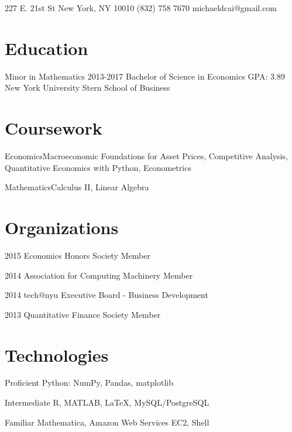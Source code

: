 \documentclass{tccv}
\begin{document}
\personal
    {227 E. 21st St \newline New York, NY 10010}
    {(832) 758 7670}
    {michaeldcai@gmail.com}

\section{Education}

\begin{yearlist}

\item[Minor in Mathematics]{2013-2017}
     {Bachelor of Science \newline in Economics \newline GPA: 3.89}
     {New York University \newline Stern School of Business}

\end{yearlist}

\section{Coursework}

\begin{factlist}
\item{Economics}{Macroeconomic Foundations for Asset Prices, Competitive Analysis,
Quantitative Economics with Python, Econometrics}
\item{Mathematics}{Calculus II, Linear Algebra}
\end{factlist}

\section{Organizations}

\begin{yearlist}

\item{2015}
     {Economics Honors Society}
     {Member}

\item{2014}
     {Association for Computing \newline Machinery}
     {Member}

\item{2014}
     {tech@nyu}
     {Executive Board - Business Development}

\item{2013}
     {Quantitative Finance Society}
     {Member}

\end{yearlist}


\section{Technologies}

\begin{factlist}

\item{Proficient}
     {Python: NumPy, Pandas, matplotlib}

\item{Intermediate}
     {R, MATLAB, \LaTeX, MySQL/PostgreSQL}

\item{Familiar}
     {Mathematica, Amazon Web Services EC2, Shell}

\end{factlist}
\end{document}
